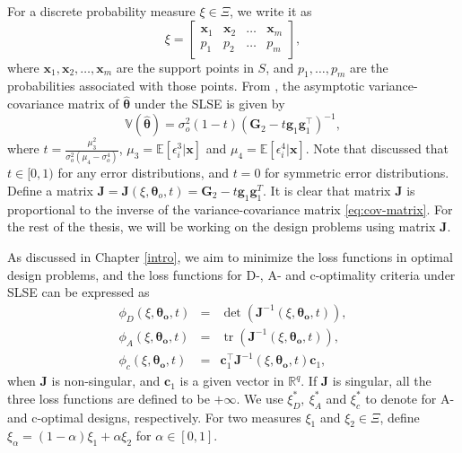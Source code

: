 \documentclass[
]{book}
\theoremstyle{definition}
\theoremstyle{definition}
\theoremstyle{definition}
\theoremstyle{definition}
\theoremstyle{remark}
\begin{document}
For a discrete probability measure \(\xi\in \Xi\), we write it as
\[
\xi=\begin{bmatrix}
    \boldsymbol{x}_1&\boldsymbol{x}_2   &\ldots &\boldsymbol{x}_m\\
    p_1     &p_2        &\ldots &p_m
\end{bmatrix},
\]
where \(\boldsymbol{x}_1,\boldsymbol{x}_2,\dots,\boldsymbol{x}_m\) are the support points in \(S\), and \(p_1,\dots,p_m\) are the probabilities associated with those points. From \citet{gao2014new}, the asymptotic variance-covariance matrix of \(\hat{\boldsymbol{\theta}}\) under the SLSE is given by
\begin{equation}
\boldsymbol{\mathbb{V}}({\boldsymbol{\hat{\theta}}})=\sigma^2_o(1-t)(\boldsymbol{G}_2-t\boldsymbol{g}_1\boldsymbol{g}_1^\top)^{-1},
\label{eq:cov-matrix}
\end{equation}
where \(t=\frac{\mu_3^2}{\sigma_o^2(\mu_4-\sigma_o^4)}\), \(\mu_3=\mathbb{E}[\epsilon_i^3|\boldsymbol{x}]\) and \(\mu_4=\mathbb{E}[\epsilon_i^4|\boldsymbol{x}]\). Note that \citet{gao2014new} discussed that \(t \in [0,1)\) for any error distributions, and \(t=0\) for symmetric error distributions. Define a matrix \(\boldsymbol{J}=\boldsymbol{J}(\xi,\boldsymbol{\theta}_o,t) = \boldsymbol{G}_2-t\boldsymbol{g}_1\boldsymbol{g}_1^T\). It is clear that matrix \(\boldsymbol{J}\) is proportional to the inverse of the variance-covariance matrix \eqref{eq:cov-matrix}. For the rest of the thesis, we will be working on the design problems using matrix \(\boldsymbol{J}\).

As discussed in Chapter \ref{intro}, we aim to minimize the loss functions in optimal design problems, and the loss functions for D-, A- and c-optimality criteria under SLSE can be expressed as
\begin{equation}
\begin{aligned}
  \phi_D(\xi,\boldsymbol{\theta_o},t)&=&\det(\boldsymbol{J}^{-1}(\xi,\boldsymbol{\theta_o},t)),\\
  \phi_A(\xi,\boldsymbol{\theta_o},t)&=&\operatorname{tr}(\boldsymbol{J}^{-1}(\xi,\boldsymbol{\theta_o},t)),\\
  \phi_c(\xi,\boldsymbol{\theta_o},t)&=&\boldsymbol{c}_1^\top\boldsymbol{J}^{-1}(\xi,\boldsymbol{\theta_o},t)\boldsymbol{c}_1,
\end{aligned}
\label{eq:loss-J}
\end{equation}
when \(\boldsymbol{J}\) is non-singular, and \(\boldsymbol{c}_1\) is a given vector in \(\mathbb{R}^q\). If \(\boldsymbol{J}\) is singular, all the three loss functions are defined to be \(+\infty\). We use \(\xi_D^*,~\xi_A^*\) and \(\xi_c^*\) to denote for  A- and c-optimal designs, respectively. For two measures \(\xi_1\) and \(\xi_2\in \Xi\), define \(\xi_{\alpha}=(1-\alpha)\xi_1+\alpha \xi_2\) for \(\alpha \in[0,1]\).
\end{document}
